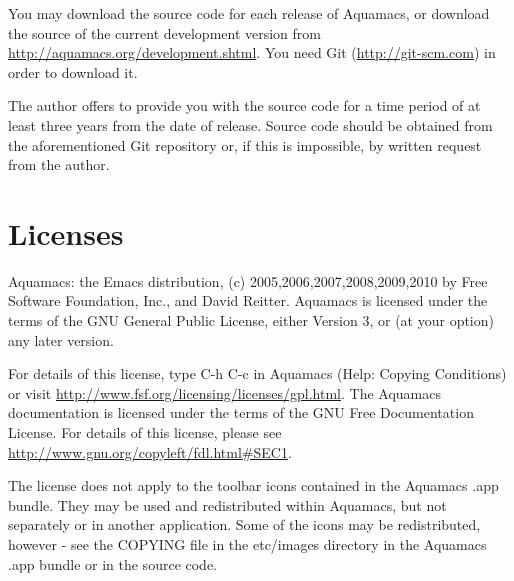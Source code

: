 \documentclass[11pt,letterpaper]{article}
\begin{document}
You may download the source code for each release of Aquamacs, or
download the source of the current development version from
\url{http://aquamacs.org/development.shtml}.  You need Git (\url{http://git-scm.com}) in order to download it.

The author offers  to provide you with the source code for a time period of
at least three years from the date of release. Source code should be
obtained from the aforementioned Git repository or,
if this is impossible, by written request from the author.

\section {Licenses}

Aquamacs: the Emacs distribution, (c) 2005,2006,2007,2008,2009,2010 by Free Software
Foundation, Inc., and David Reitter. Aquamacs is licensed under the
terms of the GNU General Public License, either Version 3, or (at your
option) any later version. 

For details of
this license, type C-h C-c in Aquamacs (Help: Copying Conditions) or
visit \url{http://www.fsf.org/licensing/licenses/gpl.html}. The
Aquamacs documentation is licensed under the terms of the GNU Free
Documentation License. For details of this license, please see
\url{http://www.gnu.org/copyleft/fdl.html#SEC1}.

The license does not apply to the toolbar icons contained in the
Aquamacs .app bundle. They may be used and redistributed within
Aquamacs, but not separately or in another application. Some of the
icons may be redistributed, however - see the COPYING file in the etc/images
directory in the Aquamacs .app bundle or in the source code.



\end{document}
